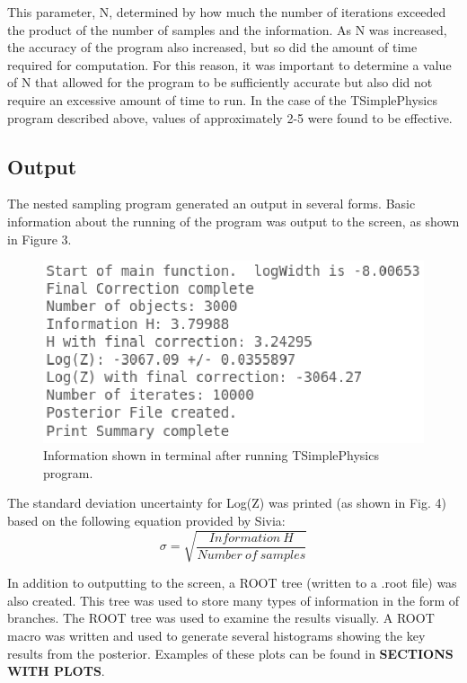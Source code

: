 \documentclass[a4paper,12pt]{article}
\begin{document}
This parameter, N, determined by how much the number of iterations exceeded the product of the number of samples and the information.  As N was increased, the accuracy of the program also increased, but so did the amount of time required for computation.  For this reason, it was important to determine a value of N that allowed for the program to be sufficiently accurate but also did not require an excessive amount of time to run.  In the case of the TSimplePhysics program described above, values of approximately 2-5 were found to be effective.



\subsection{Output}
The nested sampling program generated an output in several forms.  Basic information about the running of the program was output to the screen, as shown in Figure 3.

\begin{figure}[!h]
 \begin{center}
  \includegraphics[scale=1]{term_output.eps}
  \caption{Information shown in terminal after running TSimplePhysics program.}
 \end{center}
\end{figure}

The standard deviation uncertainty for Log(Z) was printed (as shown in Fig. 4) based on the following equation provided by Sivia\cite{sivia}:
\begin{equation}
 \sigma = \sqrt{\frac{Information\  H}{Number\  of\  samples}}
\end{equation}


In addition to outputting to the screen, a ROOT tree (written to a .root file) was also created.  This tree was used to store many types of information in the form of branches.  The ROOT tree was used to examine the results visually.  A ROOT macro was written and used to generate several histograms showing the key results from the posterior.  Examples of these plots can be found in \textbf{SECTIONS WITH PLOTS}.
\end{document}

